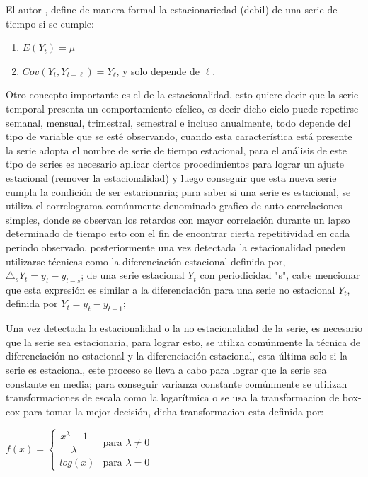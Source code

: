 \documentclass[12pt,letterpaper]{report}
\begin{document}
El autor \cite{Tsay}, define de manera formal la estacionariedad (debil) de una serie de tiempo si se cumple:

\begin{enumerate}
\item $E(Y_t) = \mu$
\item $Cov(Y_t,Y_{t-\ell}) = Y_\ell$, y solo depende de $\ell$.
\end{enumerate}

Otro concepto importante es el de la estacionalidad, esto quiere decir que la serie temporal presenta un comportamiento cíclico, es decir dicho ciclo puede repetirse semanal,  mensual, trimestral, semestral e incluso anualmente, todo depende del tipo de variable que se esté observando, cuando esta característica está presente la serie adopta el nombre de serie de tiempo estacional, para el análisis de este tipo de series es necesario aplicar ciertos procedimientos para lograr un ajuste estacional (remover la estacionalidad) y luego conseguir que esta nueva serie cumpla la condición de ser estacionaria; para saber si una serie es estacional, se utiliza el correlograma comúnmente denominado grafico de auto correlaciones simples, donde se observan los retardos con mayor correlación durante un lapso determinado de tiempo esto con el fin de encontrar cierta repetitividad en cada periodo observado, posteriormente una vez detectada la estacionalidad pueden utilizarse técnicas como la diferenciación estacional definida por, $\triangle_s Y_t = y_{t}-y_{t-s}$; de una serie estacional $Y_t$ con periodicidad "s", cabe mencionar que esta expresión es similar a la diferenciación para una serie no estacional $Y_t$, definida por $Y_t=y_{t}-y_{t-1}$; \cite{Tsay}

Una vez detectada la estacionalidad o la no estacionalidad de la serie, es necesario que la serie sea estacionaria, para lograr esto, se utiliza comúnmente la técnica de diferenciación no estacional y la diferenciación estacional, esta última solo si la serie es estacional, este proceso se lleva a cabo para lograr que la serie sea constante en media; para conseguir varianza constante comúnmente se utilizan transformaciones de escala como la logarítmica o se usa la transformacion de box-cox para tomar la mejor decisión, dicha transformacion esta definida por:

\begin{center}
$f(x) = \left\{
\begin{matrix}
  \dfrac{x^\lambda - 1}{\lambda}   &  \mbox{para } \lambda \not= 0 \\
    log(x)                        &   \mbox{para } \lambda = 0 
\end{matrix}\right.$
\end{center}
\end{document}
